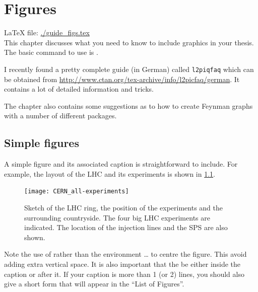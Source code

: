 
\chapter{Figures}%
\label{sec:fig}

\LaTeX{} file: \url{./guide_figs.tex}\\[1ex]
\noindent
This chapter discusses what you need to know to include graphics in
your thesis. The basic command to use is .

I recently found a pretty complete guide (in German) called \texttt{l2piqfaq}
which can be obtained from
\url{http://www.ctan.org/tex-archive/info/l2picfaq/german}. It contains
a lot of detailed information and tricks.

The chapter also contains some suggestions as to how to create Feynman
graphs with a number of different packages.

\section{Simple figures}%
\label{sec:fig:simple}

A simple figure and its associated caption is straightforward to
include. For example, the layout of the LHC and its experiments is
shown in \cref{fig:LHC}.

\begin{figure}[htbp]
  \centering
  \texttt{[image: CERN\_all-experiments]}
  \caption[Sketch of the LHC ring, the position of the experiments and
  the surrounding countryside.]{Sketch of the LHC ring, the position
    of the experiments and the surrounding countryside. The four big
    LHC experiments are indicated. The location of the injection lines
    and the SPS are also shown.}%
  \label{fig:LHC}
\end{figure}

Note the use of  rather than the environment
 \ldots {} to centre the figure. This
avoid adding extra vertical space. It is also important that the
 be either inside the caption or after it. If your
caption is more than 1 (or 2) lines, you should also give a short form
that will appear in the ``List of Figures''.

